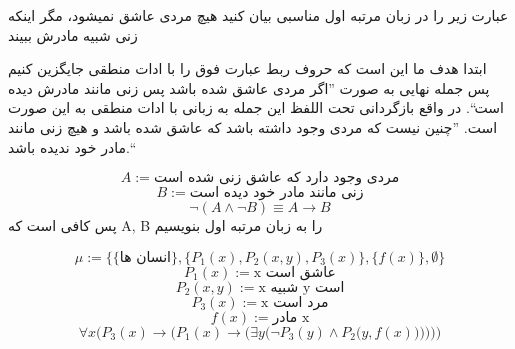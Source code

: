 عبارت زیر را در زبان مرتبه اول مناسبی بیان کنید
هیچ مردی عاشق نمیشود، مگر اینکه زنی شبیه مادرش ببیند
\begin{ans}
	ابتدا هدف ما این است که حروف ربط عبارت فوق را با ادات منطقی جایگزین کنیم پس جمله نهایی به صورت ''اگر مردی عاشق شده باشد پس زنی مانند مادرش دیده است``. در واقع بازگردانی تحت اللفظ این جمله به زبانی با ادات منطقی به این صورت است. ''چنین نیست که مردی وجود داشته باشد که عاشق شده باشد و هیچ زنی مانند مادر خود ندیده باشد.``
	
		$$
		A := \text{مردی وجود دارد که عاشق زنی شده است}
		$$
		$$
		B := \text{زنی مانند مادر خود دیده است}
		$$
		$$
		\neg (A \wedge \neg B) \equiv A \rightarrow {B}
		$$
		پس کافی است که A, B را به زبان مرتبه اول بنویسیم	
		
		$$
			\mathcal{\mu} := \{\{\text{انسان ها}\}, \{P_1(x), P_2(x, y), P_3(x)\}, \{f(x)\}, \emptyset\}
		$$
		$$
			{P_1}(x) := \text{x عاشق است}
		$$
		$$
			{P_2}(x, y) := \text{x شبیه y است}
		$$
		$$
			{P_3}(x) := \text{x مرد است}
		$$
		$$
			f(x) := \text{مادر x}
		$$
		$$
			\forall x \Big({P_3}(x) \rightarrow \Big({{P_1}(x) \rightarrow \Big({\exists y \Big(\neg {P_3}(y) \wedge {P_2}\Big(y, f(x)\Big)\Big)}}\Big)  \Big)\Big)
		$$
		
	
\end{ans}
